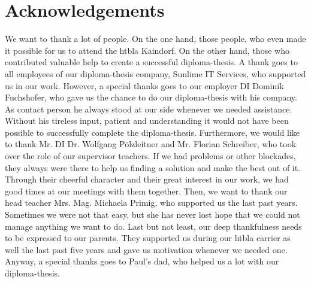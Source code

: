 \chapter*{Acknowledgements}
We want to thank a lot of people. On the one hand, those people, who even made it possible for us to attend the \gls{htbla} Kaindorf. On the other hand, those who contributed valuable help to create a successful diploma-thesis.
\newline \newline
A thank goes to all employees of our diploma-thesis company, Sunlime IT Services, who supported us in our work. However, a special thanks goes to our employer DI Dominik Fuchshofer, who gave us the chance to do our diploma-thesis with his company. As contact person he always stood at our side whenever we needed assistance. Without his tireless input, patient and understanding it would not have been possible to successfully complete the diploma-thesis.
\newline \newline
Furthermore, we would like to thank Mr. DI Dr. Wolfgang Pölzleitner and Mr. Florian Schreiber, who took over the role of our supervisor teachers. If we had problems or other blockades, they always were there to help us finding a solution and make the best out of it. Through their cheerful character and their great interest in our work, we had good times at our meetings with them together.
\newline \newline
Then, we want to thank our head teacher Mrs. Mag. Michaela Primig, who supported us the last past years. Sometimes we were not that easy, but she has never lost hope that we could not manage anything we want to do.
\newline \newline
Last but not least, our deep thankfulness needs to be expressed to our parents. They supported us during our \gls{htbla} carrier as well the last past five years and gave us motivation whenever we needed one. Anyway, a special thanks goes to Paul’s dad, who helped us a lot with our diploma-thesis.
